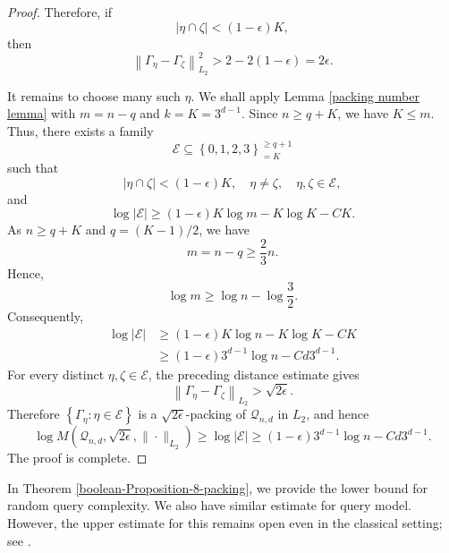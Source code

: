 \documentclass{amsbook}
\theoremstyle{definition}
\theoremstyle{remark}
\numberwithin{section}{chapter}
\numberwithin{equation}{chapter}
\newcommand{\1}{\mathbf{1}}
\begin{document}
\begin{proof}
Therefore, if
\[
|\eta\cap\zeta|<(1-\epsilon)K,
\]
then
\[
\left\|\Gamma_{\eta}-\Gamma_{\zeta}\right\|_{L_{2}}^{2}>2-2(1-\epsilon)=2\epsilon.
\]

It remains to choose many such $\eta$. We shall apply Lemma \ref{packing number lemma} with \(m=n-q\) and \(k=K=3^{d-1}.\)
Since $n\geq q+K$, we have $K\leq m$. Thus, there exists a family
\[
\mathcal{E}\subseteq\left\{0,1,2,3\right\}^{\geq q+1}_{=K}
\]
such that
\[
|\eta\cap\zeta|<(1-\epsilon)K,\quad\eta\neq\zeta,\quad\eta,\zeta\in\mathcal{E},
\]
and
\[
\log\left|\mathcal{E}\right|
\geq
(1-\epsilon)K\log m-K\log K-CK.
\]
As $n\geq q+K$ and $q=(K-1)/2$, we have
\[
m=n-q\geq\frac{2}{3}n.
\]
Hence,
\[
\log m\geq\log n-\log\frac{3}{2}.
\]
Consequently,
\[
\begin{split}
\log\left|\mathcal{E}\right|
&\geq(1-\epsilon)K\log n-K\log K-CK\\
&\geq(1-\epsilon)3^{d-1}\log n-Cd3^{d-1}.
\end{split}
\]
For every distinct $\eta,\zeta\in\mathcal{E}$, the preceding distance estimate gives
\[
\left\|\Gamma_{\eta}-\Gamma_{\zeta}\right\|_{L_{2}}>\sqrt{2\epsilon}.
\]
Therefore $\left\{\Gamma_{\eta}:\eta\in\mathcal{E}\right\}$ is a $\sqrt{2\epsilon}$-packing of $\mathcal{Q}_{n,d}$ in $L_{2}$, and hence
\[
\log M\left(\mathcal{Q}_{n,d},\sqrt{2\epsilon},\|\cdot\|_{L_{2}}\right)\geq\log\left|\mathcal{E}\right|\geq(1-\epsilon)3^{d-1}\log n-Cd3^{d-1}.
\]
The proof is complete.
\end{proof}


In Theorem \ref{boolean-Proposition-8-packing}, we provide the lower bound for random query complexity. We also have similar estimate for query model. However, the upper estimate for this remains open even in the classical setting; see \cite[page 12]{EIS2023}. 
\end{document}
